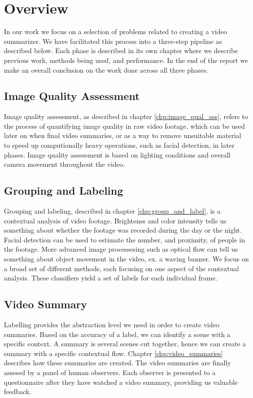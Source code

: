 \section{Overview}
%
In our work we focus on a selection of problems related to creating a video summarizer. We have facilitated this process into a three-step pipeline as described below. Each phase is described in its own chapter where we describe previous work, methods being used, and performance. In the end of the report we make an overall conclusion on the work done across all three phases.
%
\subsection{Image Quality Assessment}\label{sec:videoclipsegmentation}
%
Image quality assessment, as described in chapter \ref{chp:image_qual_ass}, refers to the process of quantifying image quality in raw video footage, which can be used later on when final video summaries, or as a way to remove unsuitable material to speed up computionally heavy operations, such as facial detection, in later phases. Image quality assessment is based on lighting conditions and overall camera movement throughout the video.
%
\subsection{Grouping and Labeling}
%
Grouping and labeling, described in chapter \ref{chp:group_and_label}, is a contextual analysis of video footage. Brightenss and color intensity tells us something about whether the footage was recorded during the day or the night. Facial detection can be used to estimate the number, and proximity, of people in the footage. More advanced image processesing such as optical flow can tell us something about object movement in the video, ex. a waving banner. We focus on a broad set of different methods, each focusing on one aspect of the contextual analysis. These classifiers yield a set of labels for each individual frame.
%
\subsection{Video Summary}
%
Labelling provides the abstraction level we need in order to create video summaries. Based on the accuracy of a label, we can identify a scene with a specific context. A summary is several scenes cut together, hence we can create a summary with a specific contextual flow. Chapter \ref{chp:video_summaries} describes how these summaries are created. The video summaries are finally assesed by a panel of human observers. Each observer is presented to a questionnaire after they have watched a video summary, providing us valuable feedback.
%
